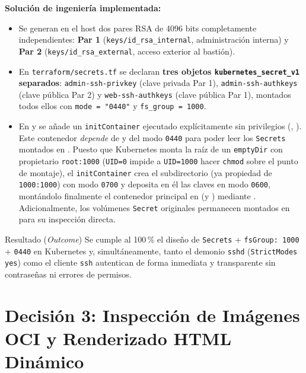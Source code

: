 \textbf{Solución de ingeniería implementada:}
\begin{itemize}
  \item Se generan en el host dos pares RSA de 4096 bits completamente independientes: \textbf{Par 1} (\texttt{keys/id\_rsa\_internal}, administración interna) y \textbf{Par 2} (\texttt{keys/id\_rsa\_external}, acceso exterior al bastión).
  \item En \texttt{terraform/secrets.tf} se declaran \textbf{tres objetos \texttt{kubernetes\_secret\_v1} separados}: \texttt{admin-ssh-privkey} (clave privada Par 1), \texttt{admin-ssh-authkeys} (clave pública Par 2) y \texttt{web-ssh-authkeys} (clave pública Par 1), montados todos ellos con \texttt{mode = "0440"} y \texttt{fs\_group = 1000}.
  \item En  y  se añade un \texttt{initContainer} ejecutado explícitamente sin privilegios (, ). Este contenedor \emph{depende} de  y del modo \texttt{0440} para poder leer los \texttt{Secrets} montados en . Puesto que Kubernetes monta la raíz de un \texttt{emptyDir} con propietario \texttt{root:1000} (\texttt{UID=0} impide a \texttt{UID=1000} hacer \texttt{chmod} sobre el punto de montaje), el \texttt{initContainer} crea el subdirectorio  (ya propiedad de \texttt{1000:1000}) con modo \texttt{0700} y deposita en él las claves en modo \texttt{0600}, montándolo finalmente el contenedor principal en  (y ) mediante . Adicionalmente, los volúmenes \texttt{Secret} originales permanecen montados en  para su inspección directa.
\end{itemize}

\begin{outcomebox}{Resultado (\textit{Outcome})}
Se cumple al 100\,\% el diseño de \texttt{Secrets} + \texttt{fsGroup: 1000} + \texttt{0440} en Kubernetes y, simultáneamente, tanto el demonio \texttt{sshd} (\texttt{StrictModes yes}) como el cliente \texttt{ssh} autentican de forma inmediata y transparente sin contraseñas ni errores de permisos.
\end{outcomebox}

\section{Decisión 3: Inspección de Imágenes OCI y Renderizado HTML Dinámico}

